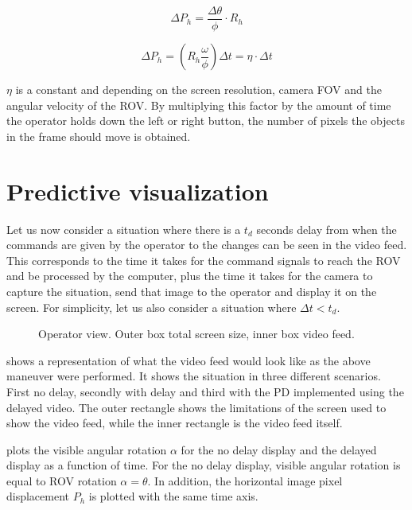 \begin{equation}\label{deltaph}
\Delta P_h = \frac{\Delta \theta}{\phi}\cdot R_h
\end{equation}

\begin{equation}\label{pixelturnrate}
\Delta P_h = \left ( R_h\frac{\omega }{\phi} \right )\Delta t = \eta \cdot  \Delta t
\end{equation}

$\eta$ is a constant and depending on the screen resolution, camera FOV and the angular velocity of the ROV. By multiplying this factor by the amount of time the operator holds down the left or right button, the number of pixels the objects in the frame should move is obtained.

\section{Predictive visualization}

Let us now consider a situation where there is a $t_d$ seconds delay from when the commands are given by the operator to the changes can be seen in the video feed. This corresponds to the time it takes for the command signals to reach the ROV and be processed by the computer, plus the time it takes for the camera to capture the situation, send that image to the operator and display it on the screen. For simplicity, let us also consider a situation where $\Delta t < t_d$.

\begin{figure}[h!]    
    \centering           
    \def\svgwidth{.8\columnwidth}
    
    \caption{Operator view. Outer box total screen size, inner box video feed.}
    \label{movie}
\end{figure}

 shows a representation of what the video feed would look like as the above maneuver were performed. It shows the situation in three different scenarios. First no delay, secondly with delay and third with the PD implemented using the delayed video. The outer rectangle shows the limitations of the screen used to show the video feed, while the inner rectangle is the video feed itself.

 plots the visible angular rotation $\alpha$ for the no delay display and the delayed display as a function of time. For the no delay display, visible angular rotation is equal to ROV rotation $\alpha = \theta$. In addition, the horizontal image pixel displacement $P_h$ is plotted with the same time axis.

